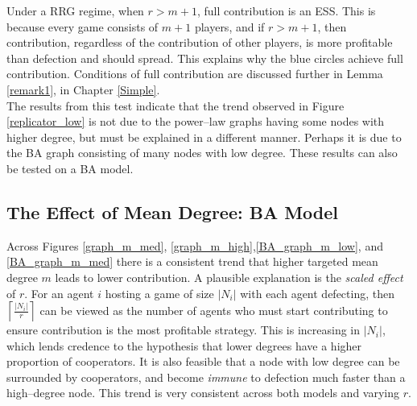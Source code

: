 Under a RRG regime, when $r>m+1$, full contribution is an ESS. This is because every game consists of $m+1$ players, and if $r>m+1$, then contribution, regardless of the contribution of other players, is more profitable than defection and should spread. This explains why the blue circles achieve full contribution. Conditions of full contribution are discussed further in Lemma \ref{remark1}, in Chapter \ref{Simple}. \\

The results from this test indicate that the trend observed in Figure \ref{replicator_low} is not due to the power--law graphs having some nodes with higher degree, but must be explained in a different manner. Perhaps it is due to the BA graph consisting of many nodes with low degree. These results can also be tested on a BA model. 

\subsection{The Effect of Mean Degree: BA Model}
\FloatBarrier
{}
\FloatBarrier
{}
\FloatBarrier
Across Figures \ref{graph_m_med}, \ref{graph_m_high},\ref{BA_graph_m_low}, and \ref{BA_graph_m_med} there is a consistent trend that higher targeted mean degree $m$ leads to lower contribution. A plausible explanation is the \emph{scaled effect} of $r$. For an agent $i$ hosting a game of size $|N_i|$ with each agent defecting, then $\left\lceil \frac{|N_i|}{r}\right\rceil$ can be viewed as the number of agents who must start contributing to ensure contribution is the most profitable strategy. This is increasing in $|N_i|$, which lends credence to the hypothesis that lower degrees have a higher proportion of cooperators. It is also feasible that a node with low degree can be surrounded by cooperators, and become \emph{immune} to defection much faster than a high--degree node. This trend is very consistent across both models and varying $r$. \\

